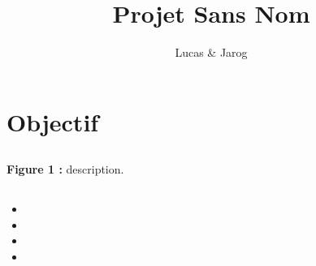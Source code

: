 \documentclass{report}
\title{Projet Sans Nom}
\author{Lucas \& Jarog}
\date{} %
\begin{document}
        \maketitle %



\chapter{Objectif}
        \section{}
                \paragraph*{}
                        \begin{center}
                                \textbf{Figure 1 :} description.
                        \end{center}
        \section{}
                \paragraph*{}
                        \begin{itemize} %
                                \item
                                \item
                                \item
                                \item
                        \end{itemize} 
\end{document}
